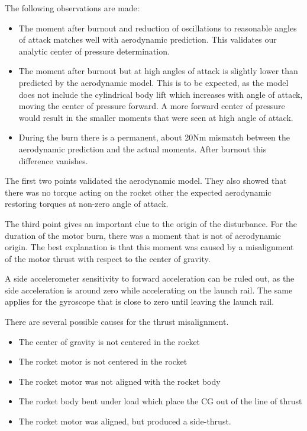 The following observations are made:
\begin{itemize}
\item The moment after burnout and reduction of oscillations to reasonable angles of attack matches well with aerodynamic prediction. This validates our analytic center of pressure determination.
\item The moment after burnout but at high angles of attack is slightly lower than predicted by the aerodynamic model. This is to be expected, as the model does not include the cylindrical body lift which increases with angle of attack, moving the center of pressure forward. A more forward center of pressure would result in the smaller moments that were seen at high angle of attack.
\item During the burn there is a permanent, about 20Nm mismatch between the aerodynamic prediction and the actual moments. After burnout this difference vanishes.
\end{itemize}

The first two points validated the aerodynamic model.
They also showed that there was no torque acting on the rocket other the expected aerodynamic restoring torques at non-zero angle of attack.

The third point gives an important clue to the origin of the disturbance. For the duration of the motor burn, there was a moment that is not of aerodynamic origin.
The best explanation is that this moment was caused by a misalignment of the motor thrust with respect to the center of gravity.

A side accelerometer sensitivity to forward acceleration can be ruled out, as the side acceleration is around zero while accelerating on the launch rail.
The same applies for the gyroscope that is close to zero until leaving the launch rail.

There are several possible causes for the thrust misalignment.
\begin{itemize}
    \item The center of gravity is not centered in the rocket
    \item The rocket motor is not centered in the rocket
    \item The rocket motor was not aligned with the rocket body
    \item The rocket body bent under load which place the CG out of the line of thrust
    \item The rocket motor was aligned, but produced a side-thrust.
\end{itemize}

